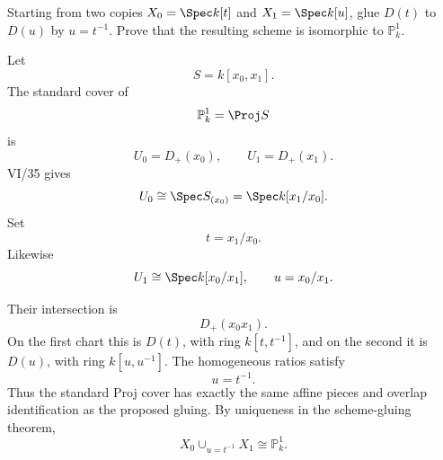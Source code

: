 \begin{problem}\label{prob:vi36-01}
Starting from two copies \(X_0=\Spec k[t]\) and \(X_1=\Spec k[u]\), glue \(D(t)\) to \(D(u)\) by \(u=t^{-1}\). Prove that the resulting scheme is isomorphic to \(\mathbb P^1_k\).
\end{problem}

\ifdefined\FullProblemDossiers
\begin{solution}
Let
\[
S=k[x_0,x_1].
\]
The standard cover of
\[
\mathbb P^1_k=\Proj S
\]
is
\[
U_0=D_+(x_0),
\qquad
U_1=D_+(x_1).
\]
VI/35 gives
\[
U_0\cong\Spec S_{(x_0)}
=
\Spec k[x_1/x_0].
\]
Set
\[
t=x_1/x_0.
\]
Likewise
\[
U_1\cong\Spec k[x_0/x_1],
\qquad
u=x_0/x_1.
\]

Their intersection is
\[
D_+(x_0x_1).
\]
On the first chart this is \(D(t)\), with ring \(k[t,t^{-1}]\), and on the second it is \(D(u)\), with ring
\(k[u,u^{-1}]\). The homogeneous ratios satisfy
\[
u=t^{-1}.
\]
Thus the standard Proj cover has exactly the same affine pieces and overlap identification as the proposed gluing.
By uniqueness in the scheme-gluing theorem,
\[
\boxed{
X_0\cup_{u=t^{-1}}X_1
\cong
\mathbb P^1_k.
}
\]
\end{solution}
\fi
